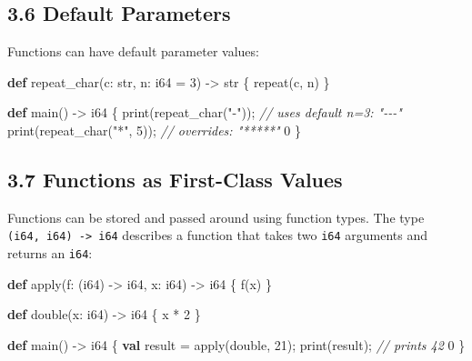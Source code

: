 \documentclass[
  english,
]{book}
\newenvironment{Shaded}{\begin{snugshade}}{\end{snugshade}}
\newcommand{\CommentTok}[1]{\textcolor[rgb]{0.42,0.60,0.33}{\textit{#1}}}
\newcommand{\DataTypeTok}[1]{\textcolor[rgb]{0.31,0.79,0.69}{#1}}
\newcommand{\DecValTok}[1]{\textcolor[rgb]{0.71,0.81,0.66}{#1}}
\newcommand{\FunctionTok}[1]{\textcolor[rgb]{0.86,0.86,0.67}{#1}}
\newcommand{\KeywordTok}[1]{\textcolor[rgb]{0.34,0.61,0.84}{\textbf{#1}}}
\newcommand{\NormalTok}[1]{\textcolor[rgb]{0.83,0.83,0.83}{#1}}
\newcommand{\OperatorTok}[1]{\textcolor[rgb]{0.83,0.83,0.83}{#1}}
\newcommand{\StringTok}[1]{\textcolor[rgb]{0.81,0.57,0.47}{#1}}
\begin{document}
\subsection{3.6 Default Parameters}\label{default-parameters}

Functions can have default parameter values:

\begin{Shaded}
\begin{Highlighting}[]
\KeywordTok{def}\NormalTok{ repeat\_char(c: }\DataTypeTok{str}\NormalTok{, n: }\DataTypeTok{i64} \OperatorTok{=} \DecValTok{3}\NormalTok{) }\OperatorTok{{-}\textgreater{}} \DataTypeTok{str}\NormalTok{ \{}
    \FunctionTok{repeat}\NormalTok{(c, n)}
\NormalTok{\}}

\KeywordTok{def}\NormalTok{ main() }\OperatorTok{{-}\textgreater{}} \DataTypeTok{i64}\NormalTok{ \{}
    \FunctionTok{print}\NormalTok{(repeat\_char(}\StringTok{"{-}"}\NormalTok{));      }\CommentTok{// uses default n=3: "{-}{-}{-}"}
    \FunctionTok{print}\NormalTok{(repeat\_char(}\StringTok{"*"}\NormalTok{, }\DecValTok{5}\NormalTok{));   }\CommentTok{// overrides: "*****"}
    \DecValTok{0}
\NormalTok{\}}
\end{Highlighting}
\end{Shaded}

\subsection{3.7 Functions as First-Class
Values}\label{functions-as-first-class-values}

Functions can be stored and passed around using function types. The type
\texttt{(i64,\ i64)\ -\textgreater{}\ i64} describes a function that
takes two \texttt{i64} arguments and returns an \texttt{i64}:

\begin{Shaded}
\begin{Highlighting}[]
\KeywordTok{def}\NormalTok{ apply(f: (}\DataTypeTok{i64}\NormalTok{) }\OperatorTok{{-}\textgreater{}} \DataTypeTok{i64}\NormalTok{, x: }\DataTypeTok{i64}\NormalTok{) }\OperatorTok{{-}\textgreater{}} \DataTypeTok{i64}\NormalTok{ \{}
\NormalTok{    f(x)}
\NormalTok{\}}

\KeywordTok{def}\NormalTok{ double(x: }\DataTypeTok{i64}\NormalTok{) }\OperatorTok{{-}\textgreater{}} \DataTypeTok{i64}\NormalTok{ \{}
\NormalTok{    x }\OperatorTok{*} \DecValTok{2}
\NormalTok{\}}

\KeywordTok{def}\NormalTok{ main() }\OperatorTok{{-}\textgreater{}} \DataTypeTok{i64}\NormalTok{ \{}
    \KeywordTok{val} \DataTypeTok{result} \OperatorTok{=}\NormalTok{ apply(double, }\DecValTok{21}\NormalTok{);}
    \FunctionTok{print}\NormalTok{(}\DataTypeTok{result}\NormalTok{);   }\CommentTok{// prints 42}
    \DecValTok{0}
\NormalTok{\}}
\end{Highlighting}
\end{Shaded}
\end{document}
